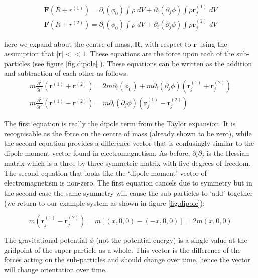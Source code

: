 \begin{eqnarray}
\mathbf{F} (R +r^{(1)}) = \partial_i(\phi_0) \int \rho\;dV + \partial_i(\partial_j \phi) \int \rho \mathbf{r}^{(1)}_j\;dV \\
\mathbf{F} (R +r^{(2)}) = \partial_i(\phi_0) \int \rho\;dV + \partial_i(\partial_j \phi) \int \rho \mathbf{r}^{(2)}_j\;dV 
\end{eqnarray}

\noindent here we expand about the centre of mass, $\mathbf{R}$, with respect to $\mathbf{r}$ using the assumption that $|\mathbf{r}|<<1$. These equations are the force upon each of the sub-particles (see figure \ref{fig.dipole} ). These equations can be written as the addition and subtraction of each other as follows:
\begin{eqnarray}
m \frac{\partial^2}{\partial t^2} (\mathbf{r}^{(1)} + \mathbf{r}^{(2)}) = 2m \partial_i(\phi_0) + m \partial_i(\partial_j \phi) (\mathbf{r}^{(1)}_j + \mathbf{r}^{(2)}_j) \\
m \frac{\partial^2}{\partial t^2} (\mathbf{r}^{(1)} - \mathbf{r}^{(2)}) = m \partial_i(\partial_j \phi)  (\mathbf{r}^{(1)}_j - \mathbf{r}^{(2)}_j)
\end{eqnarray}

\noindent The first equation is really the dipole term from the Taylor expansion. It is recognisable as the force on the centre of mass (already shown to be zero), while the second equation provides a difference vector that is confusingly similar to the dipole moment vector found in electromagnetism. As before, $\partial_i\partial_j$ is the Hessian matrix which is a three-by-three symmetric matrix with five degrees of freedom. The second equation that looks like the `dipole moment' vector of electromagnetism is non-zero. The first equation cancels due to symmetry but in the second case the same symmetry will cause the sub-particles to `add' together (we return to our example system as shown in figure \ref{fig.dipole}):

\begin{equation}
m \left(\mathbf{r}^{(1)}_j - \mathbf{r}^{(2)}_j\right) = m [(x,0,0) - (-x,0,0)] = 2m (x,0,0)
\end{equation}

The gravitational potential $\phi$ (not the potential energy) is a single value at the gridpoint of the super-particle as a whole. This vector is the difference of the forces acting on the sub-particles and should change over time, hence the vector will change orientation over time.

